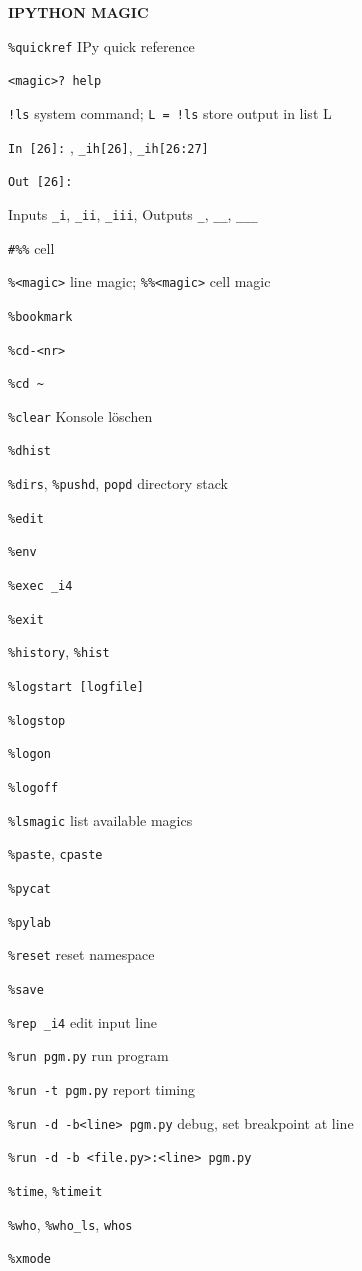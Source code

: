 \documentclass[9pt,a4wide]{extarticle}
\begin{document}
\bigskip
{\large\bf IPYTHON MAGIC}

\setlength{\columnsep}{1cm}
\begin{multicols}{3}

{\tt \%quickref} \rval IPy quick reference

{\tt <magic>? \rval help}

{\tt !ls} \rval system command; {\tt L = !ls} store output in list L

{\tt In [26]:} , {\tt \_ih[26]}, {\tt \_ih[26:27]}

{\tt Out [26]:} 

Inputs {\tt \_i}, {\tt \_ii}, {\tt \_iii}, 
Outputs {\tt \_}, {\tt \_\_}, {\tt \_\_\_} 

{\tt \#\%\%} \rval  cell

{\tt \%<magic>} \rval line magic; {\tt \%\%<magic>} \rval cell magic

{\tt \%bookmark}

{\tt \%cd-<nr>}

{\tt \%cd \~{}}

{\tt \%clear} \rval Konsole löschen

{\tt \%dhist}

{\tt \%dirs}, {\tt \%pushd}, {\tt popd} \rval directory stack

{\tt \%edit}

{\tt \%env}

{\tt \%exec \_i4}

{\tt \%exit}

{\tt \%history}, {\tt \%hist}

{\tt \%logstart [logfile]}

{\tt \%logstop}

{\tt \%logon}

{\tt \%logoff}

{\tt \%lsmagic} \rval list available magics

{\tt \%paste}, {\tt cpaste}

{\tt \%pycat}

{\tt \%pylab}

{\tt \%reset} \rval reset namespace

{\tt \%save}

{\tt \%rep \_i4} \rval edit input line

{\tt \%run pgm.py} \rval run program

{\tt \%run -t pgm.py} \rval report timing

{\tt \%run -d -b<line> pgm.py} \rval debug, set breakpoint at line

{\tt \%run -d -b <file.py>:<line> pgm.py}

{\tt \%time}, {\tt \%timeit}

{\tt \%who}, {\tt \%who\_ls}, {\tt whos}

{\tt \%xmode}

\end{multicols}
\end{document}
